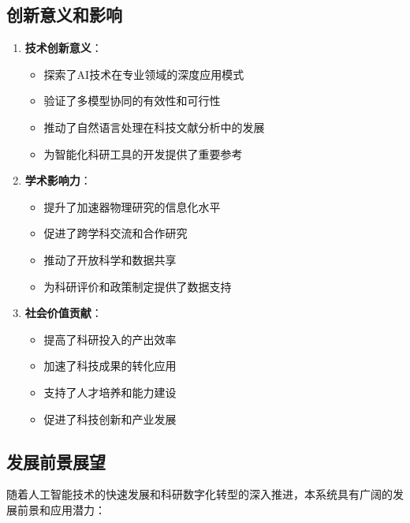 \documentclass[12pt,a4paper]{article}
\begin{document}
\subsection{创新意义和影响}
\begin{enumerate}
    \item \textbf{技术创新意义}：
        \begin{itemize}
            \item 探索了AI技术在专业领域的深度应用模式
            \item 验证了多模型协同的有效性和可行性
            \item 推动了自然语言处理在科技文献分析中的发展
            \item 为智能化科研工具的开发提供了重要参考
        \end{itemize}
    
    \item \textbf{学术影响力}：
        \begin{itemize}
            \item 提升了加速器物理研究的信息化水平
            \item 促进了跨学科交流和合作研究
            \item 推动了开放科学和数据共享
            \item 为科研评价和政策制定提供了数据支持
        \end{itemize}
    
    \item \textbf{社会价值贡献}：
        \begin{itemize}
            \item 提高了科研投入的产出效率
            \item 加速了科技成果的转化应用
            \item 支持了人才培养和能力建设
            \item 促进了科技创新和产业发展
        \end{itemize}
\end{enumerate}

\subsection{发展前景展望}
随着人工智能技术的快速发展和科研数字化转型的深入推进，本系统具有广阔的发展前景和应用潜力：
\end{document}
